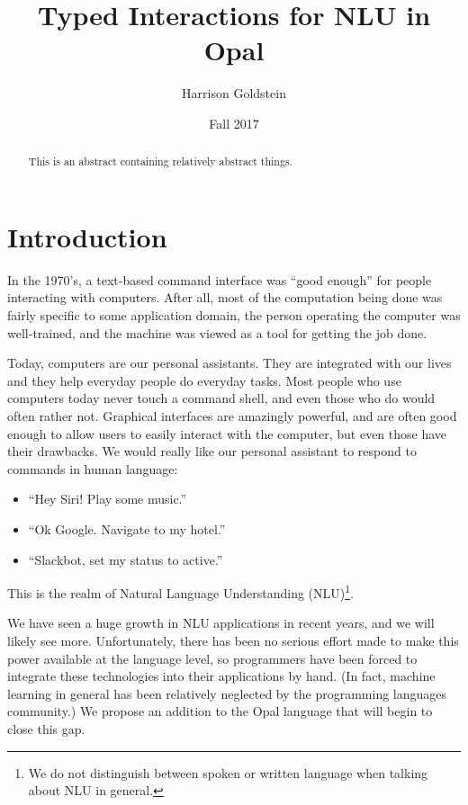 \documentclass[twocolumn]{article}
\title{Typed Interactions for NLU in Opal}
\author{Harrison Goldstein}
\date{Fall 2017}
\begin{document}
\maketitle
\begin{abstract}
  This is an abstract containing relatively abstract things.
\end{abstract}

\section{Introduction} \label{introduction}
In the 1970's, a text-based command interface was ``good enough'' for people
interacting with computers. After all, most of the computation being done was
fairly specific to some application domain, the person operating the computer
was well-trained, and the machine was viewed as a tool for getting the job done.

Today, computers are our personal assistants. They are integrated with our lives
and they help everyday people do everyday tasks. Most people who use computers
today never touch a command shell, and even those who do would often rather not.
Graphical interfaces are amazingly powerful, and are often good enough to allow
users to easily interact with the computer, but even those have their drawbacks.
We would really like our personal assistant to respond to commands in human
language:
\begin{itemize}
\item ``Hey Siri! Play some music.''
\item ``Ok Google. Navigate to my hotel.''
\item ``Slackbot, set my status to active.''
\end{itemize}
This is the realm of Natural Language Understanding (NLU)\footnote{We do not
  distinguish between spoken or written language when talking about NLU in
  general.}.

We have seen a huge growth in NLU applications in recent years, and we will
likely see more. Unfortunately, there has been no serious effort made to make
this power available at the language level, so programmers have been forced to
integrate these technologies into their applications by hand. (In fact, machine
learning in general has been relatively neglected by the programming languages
community.) We propose an addition to the Opal language that will begin to close
this gap.

\end{document}
